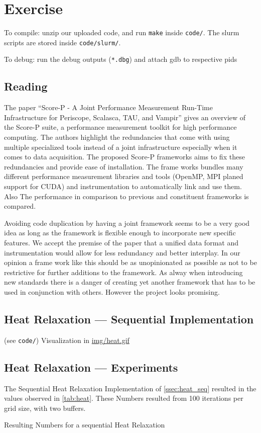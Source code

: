 \documentclass[]{scrartcl}
\newcommand{\exercise}{Exercise \thesection}
\begin{document}
\section*{\exercise}

To compile: unzip our uploaded code, and run \verb|make| inside \verb|code/|.
The slurm scripts are stored inside \verb|code/slurm/|.

To debug: run the debug outputs (\verb|*.dbg|) and attach gdb to respective pids

\subsection{Reading}
The paper \enquote{Score-P - A Joint Performance Measurement Run-Time Infrastructure
for Periscope, Scalasca, TAU, and Vampir} gives an overview of the Score-P suite,
a performance measurement toolkit for high performance computing.
The authors highlight the redundancies that come with using multiple specialized
tools instead of a joint infrastructure especially when it comes to data acquisition.
The proposed Score-P frameworks aims to fix these redundancies and provide ease of installation.
The frame works bundles many different performance measurement libraries and tools
(OpenMP, MPI planed support for CUDA) and instrumentation to automatically link and use them.
Also The performance in comparison to previous and constituent frameworks is compared.

Avoiding code duplication by having a joint framework seems to be a very good idea
as long as the framework is flexible enough to incorporate new specific features.
We accept the premise of the paper that a unified data format and instrumentation
would allow for less redundancy and better interplay. In our opinion a frame work like
this should be as unopinionated as possible as not to be restrictive for further additions
to the framework. As alway when introducing new standards there is a danger of creating yet
another framework that has to be used in conjunction with others.
However the project looks promising.

\subsection{Heat Relaxation --- Sequential Implementation}\label{ssec:heat_seq}
(see \verb|code/|)
Visualization in \href{./img/heat.gif}{img/heat.gif}
\subsection{Heat Relaxation --- Experiments}
The Sequential Heat Relaxation Implementation of \autoref{ssec:heat_seq} resulted in the values observed in \autoref{tab:heat}.
These Numbers resulted from 100 iterations per grid size, with two buffers.
\begin{table}[ht]
    \centering
    \caption{Resulting Numbers for a sequential Heat Relaxation}\label{tab:heat}
    
\end{table}
\end{document}
